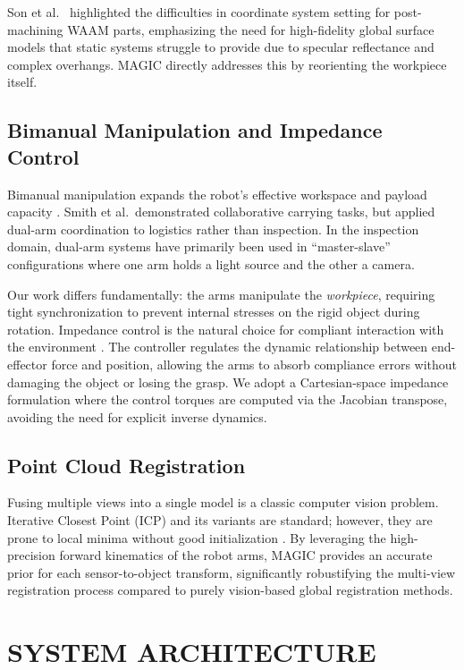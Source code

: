 \documentclass[letterpaper, 10 pt, conference]{ieeeconf}  %
\begin{document}
Son et al.\ \cite{son2024coordinate} highlighted the difficulties in
coordinate system setting for post-machining WAAM parts, emphasizing the need
for high-fidelity global surface models that static systems struggle to
provide due to specular reflectance and complex overhangs. MAGIC directly
addresses this by reorienting the workpiece itself.

\subsection{Bimanual Manipulation and Impedance Control}
Bimanual manipulation expands the robot's effective workspace and payload
capacity \cite{smith2012dual}. Smith et al.\ demonstrated collaborative
carrying tasks, but applied dual-arm coordination to logistics rather than
inspection. In the inspection domain, dual-arm systems have primarily been
used in ``master-slave'' configurations where one arm holds a light source and
the other a camera.

Our work differs fundamentally: the arms manipulate the \emph{workpiece},
requiring tight synchronization to prevent internal stresses on the rigid
object during rotation. Impedance control is the natural choice for
compliant interaction with the environment \cite{hogan1985impedance}. The
controller regulates the dynamic relationship between end-effector force and
position, allowing the arms to absorb compliance errors without damaging the
object or losing the grasp. We adopt a Cartesian-space impedance formulation
where the control torques are computed via the Jacobian transpose, avoiding
the need for explicit inverse dynamics.

\subsection{Point Cloud Registration}
Fusing multiple views into a single model is a classic computer vision
problem. Iterative Closest Point (ICP) and its variants are standard; however,
they are prone to local minima without good initialization
\cite{besl1992method}. By leveraging the high-precision forward kinematics of
the robot arms, MAGIC provides an accurate prior for each sensor-to-object
transform, significantly robustifying the multi-view registration process
compared to purely vision-based global registration methods.


\section{SYSTEM ARCHITECTURE}
\end{document}
